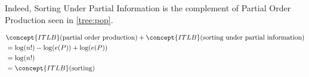 Indeed, Sorting Under Partial Information is the complement of Partial Order Production seen in \ref{tree:pop}.

\begin{align*}
& \concept{ITLB}(\text{partial order production}) + \concept{ITLB}(\text{sorting under partial information}) \\
&= \log(n!) - \log(e(P)) + \log(e(P)) \\
&= \log(n!) \\
&= \concept{ITLB}(\text{sorting})
\label{eq:complementarity}
\end{align*}